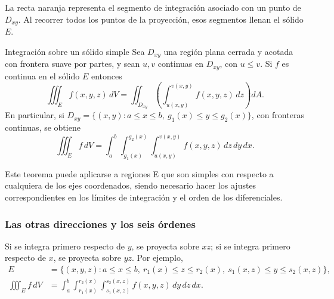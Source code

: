 \begin{center}
\end{center}
\endgroup

La recta naranja representa el segmento de integración asociado con un punto de $D_{xy}$. Al recorrer todos los puntos de la proyección, esos segmentos llenan el sólido $E$.

\begin{mytheorem}{Integración sobre un sólido simple}
Sea $D_{xy}$ una región plana cerrada y acotada con frontera suave por partes, y sean $u,v$ continuas en $D_{xy}$, con $u\leq v$. Si $f$ es continua en el sólido $E$ entonces
\[
\iiint_E f(x,y,z)\,dV
=\iint_{D_{xy}}\left(\int_{u(x,y)}^{v(x,y)}f(x,y,z)\,dz\right)dA.
\]
En particular, si $D_{xy}=\{(x,y):a\leq x\leq b,\ g_1(x)\leq y\leq g_2(x)\}$, con fronteras continuas, se obtiene
\[
\iiint_E f\,dV
=\int_a^b\int_{g_1(x)}^{g_2(x)}\int_{u(x,y)}^{v(x,y)}
f(x,y,z)\,dz\,dy\,dx.
\]
\end{mytheorem}

Este teorema puede aplicarse a regiones E que son simples con respecto a cualquiera de los ejes coordenados, siendo necesario hacer los ajustes correspondientes en los límites de integración y el orden de los diferenciales.

\subsubsection{Las otras direcciones y los seis órdenes}

Si se integra primero respecto de $y$, se proyecta sobre $xz$; si se integra primero respecto de $x$, se proyecta sobre $yz$. Por ejemplo,
\begin{align*}
E&=\{(x,y,z):a\leq x\leq b,\ r_1(x)\leq z\leq r_2(x),\
s_1(x,z)\leq y\leq s_2(x,z)\},\\
\iiint_E f\,dV
&=\int_a^b\int_{r_1(x)}^{r_2(x)}\int_{s_1(x,z)}^{s_2(x,z)}
f(x,y,z)\,dy\,dz\,dx.
\end{align*}

